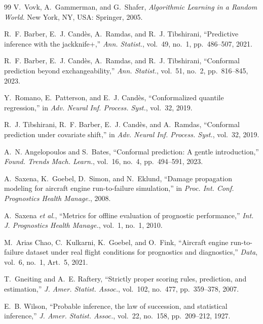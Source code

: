 \documentclass[journal]{IEEEtran}
\begin{document}
\begin{thebibliography}{99}
V.~Vovk, A.~Gammerman, and G.~Shafer, \emph{Algorithmic Learning in a Random World}. New York,
NY, USA: Springer, 2005.

R.~F. Barber, E.~J. Cand\`es, A.~Ramdas, and R.~J. Tibshirani, ``Predictive inference with the
jackknife+,'' \emph{Ann. Statist.}, vol.~49, no.~1, pp.~486--507, 2021.

R.~F. Barber, E.~J. Cand\`es, A.~Ramdas, and R.~J. Tibshirani, ``Conformal prediction beyond
exchangeability,'' \emph{Ann. Statist.}, vol.~51, no.~2, pp.~816--845, 2023.

Y.~Romano, E.~Patterson, and E.~J. Cand\`es, ``Conformalized quantile regression,'' in
\emph{Adv. Neural Inf. Process. Syst.}, vol.~32, 2019.

R.~J. Tibshirani, R.~F. Barber, E.~J. Cand\`es, and A.~Ramdas, ``Conformal prediction under
covariate shift,'' in \emph{Adv. Neural Inf. Process. Syst.}, vol.~32, 2019.

A.~N. Angelopoulos and S.~Bates, ``Conformal prediction: A gentle introduction,'' \emph{Found.
Trends Mach. Learn.}, vol.~16, no.~4, pp.~494--591, 2023.

A.~Saxena, K.~Goebel, D.~Simon, and N.~Eklund, ``Damage propagation modeling for aircraft
engine run-to-failure simulation,'' in \emph{Proc. Int. Conf. Prognostics Health Manage.},
2008.

A.~Saxena \emph{et al.}, ``Metrics for offline evaluation of prognostic performance,''
\emph{Int. J. Prognostics Health Manage.}, vol.~1, no.~1, 2010.

M.~Arias Chao, C.~Kulkarni, K.~Goebel, and O.~Fink, ``Aircraft engine run-to-failure dataset
under real flight conditions for prognostics and diagnostics,'' \emph{Data}, vol.~6, no.~1,
Art.~5, 2021.

T.~Gneiting and A.~E. Raftery, ``Strictly proper scoring rules, prediction, and estimation,''
\emph{J. Amer. Statist. Assoc.}, vol.~102, no.~477, pp.~359--378, 2007.

E.~B. Wilson, ``Probable inference, the law of succession, and statistical inference,''
\emph{J. Amer. Statist. Assoc.}, vol.~22, no.~158, pp.~209--212, 1927.

\end{thebibliography}
\end{document}

